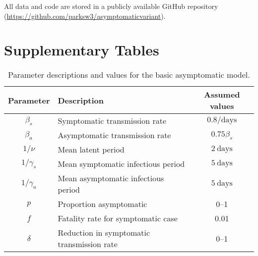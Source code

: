 \documentclass[12pt]{article}
\begin{document}
All data and code are stored in a publicly available GitHub repository (\url{https://github.com/parksw3/asymptomaticvariant}).

\pagebreak

\setcounter{figure}{0}
\renewcommand{\thefigure}{S\arabic{figure}}
\renewcommand{\thetable}{S\arabic{table}}

\pagebreak

\section*{Supplementary Tables}

\begin{table}[h!]
  \begin{center}
    \begin{tabular}{c|l|c} %
      \textbf{Parameter} & \textbf{Description} & \textbf{Assumed values}\\
      \hline
      $\beta_s$ & Symptomatic transmission rate & $0.8/\mathrm{days}$\\
      \hline
      $\beta_a$ & Asymptomatic transmission rate & $0.75 \beta_s$ \\
      \hline
      $1/\nu$ & Mean latent period & $2\ \mathrm{days}$\\
      \hline
      $1/\gamma_s$ & Mean symptomatic infectious period & $5\ \mathrm{days}$\\
      \hline
      $1/\gamma_a$ & Mean asymptomatic infectious period & $5\ \mathrm{days}$\\
      \hline
      $p$ & Proportion asymptomatic & 0--1\\
      \hline
      $f$ & Fatality rate for symptomatic case & 0.01\\
      \hline
      $\delta$ & Reduction in symptomatic transmission rate & 0--1\\
    \end{tabular}
    \caption{Parameter descriptions and values for the basic asymptomatic model.}
    \label{tab:table1}
  \end{center}
\end{table}

\pagebreak
\end{document}
